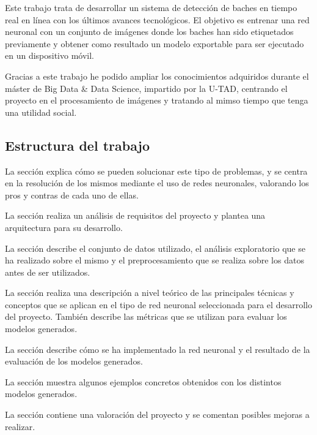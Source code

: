 Este trabajo trata de desarrollar un sistema de detección de baches en tiempo real en línea con los últimos avances tecnológicos. El objetivo es entrenar una red neuronal con un conjunto de imágenes donde los baches han sido etiquetados previamente y obtener como resultado un modelo exportable para ser ejecutado en un dispositivo móvil.

Gracias a este trabajo he podido ampliar los conocimientos adquiridos durante el máster de Big Data \& Data Science, impartido por la U-TAD, centrando el proyecto en el procesamiento de imágenes y tratando al mimso tiempo que tenga una utilidad social.

\subsection{Estructura del trabajo}

La sección \textit{} explica cómo se pueden solucionar este tipo de problemas, y se centra en la resolución de los mismos mediante el uso de redes neuronales, valorando los pros y contras de cada uno de ellas.

La sección \textit{} realiza un análisis de requisitos del proyecto y plantea una arquitectura para su desarrollo.

La sección \textit{} describe el conjunto de datos utilizado, el análisis exploratorio que se ha realizado sobre el mismo y el preprocesamiento que se realiza sobre los datos antes de ser utilizados.

La sección \textit{} realiza una descripción a nivel teórico de las principales técnicas y conceptos que se aplican en el tipo de red neuronal seleccionada para el desarrollo del proyecto. También describe las métricas que se utilizan para evaluar los modelos generados.

La sección \textit{} describe cómo se ha implementado la red neuronal y el resultado de la evaluación de los modelos generados.

La sección \textit{} muestra algunos ejemplos concretos obtenidos con los distintos modelos generados.

La sección \textit{} contiene una valoración del proyecto y se comentan posibles mejoras a realizar.